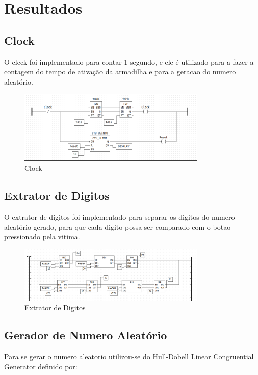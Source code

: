 \chapter{Resultados}
\label{chap:resultados}

\section{Clock}
O clcck foi implementado para contar 1 segundo, e ele é utilizado para a fazer a contagem do tempo de ativação da armadilha e para a geracao do numero aleatório.

\begin{figure}[H]
    \centering
    \includegraphics[width=0.8\textwidth]{images/clock.png}
    \caption{Clock}
    \label{fig:clock}
\end{figure}

\section{Extrator de Digitos}
O extrator de digitos foi implementado para separar os digitos do numero aleatório gerado, para que cada digito possa ser comparado com o botao pressionado pela vitima.

\begin{figure}[H]
    \centering
    \includegraphics[width=0.8\textwidth]{images/digit_extractor.png}
    \caption{Extrator de Digitos}
    \label{fig:extrator_de_digitos}
\end{figure}

\section{Gerador de Numero Aleatório}
Para se gerar o numero aleatorio utilizou-se do Hull-Dobell Linear Congruential Generator definido por:

